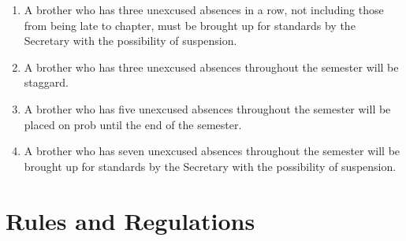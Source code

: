 	\begin{enumerate}

		\item A brother who has three unexcused absences in a row, not including those from being late to chapter, must be brought up for standards by the Secretary with the possibility of suspension.

		\item A brother who has three unexcused absences throughout the semester will be \gls{staggard}.

		\item A brother who has five unexcused absences throughout the semester will be placed on \gls{prob} until the end of the semester.

		\item A brother who has seven unexcused absences throughout the semester will be brought up for standards by the Secretary with the possibility of suspension. 

	\end{enumerate}

\section{Rules and Regulations}

